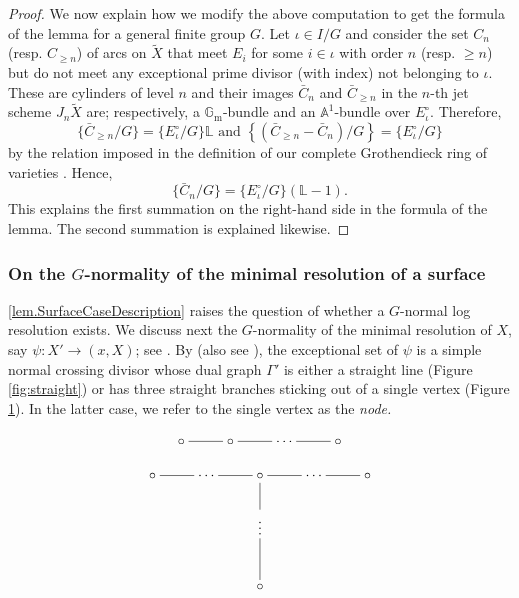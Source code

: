 \documentclass[12pt]{amsart}
\theoremstyle{plain}   %
\theoremstyle{definition}    %
\theoremstyle{remark}    %
\numberwithin{equation}{theorem}
\newcommand{\bA}{\mathbb{A}}
\newcommand{\bL}{\mathbb{L}}
\begin{document}
\begin{proof}
We now explain how we modify the above computation to get the formula of the lemma for a general finite group $G$. 
Let $\iota\in I/G$ and consider the set $C_{n}$ (resp. $C_{\ge n}$)
of arcs on $\tilde{X}$ that meet $E_{i}$ for some $i\in\iota$ with order $n$
(resp. $\ge n$) but do not meet any exceptional prime divisor (with index) not
belonging to $\iota$. These are cylinders of level $n$ and their
images $\bar{C}_n$ and $\bar{C}_{\ge n}$ in the $n$-th
jet scheme $J_{n}\tilde{X}$ are; respectively, a $\mathbb{G}_{\mathrm{m}}$-bundle and an $\bA^{1}$-bundle
over $E_{\iota}^{\circ}$. Therefore, 
\[
\{\bar{C}_{\ge n}/G\}=\{E_{\iota}^{\circ}/G\}\bL \text{ and } \left\{ \left(\bar{C}_{\ge n}-\bar{C}_n\right)/G\right\} =\{E_{\iota}^{\circ}/G\}
 \]
by the relation imposed in the definition of our complete Grothendieck
ring of varieties \cite[Definitions 9.5 and 9.6]{YasudaMotivicIntegrationDeligneMumfordStack}.
Hence, 
\[
\{\bar{C}_n/G\}=\{E_{\iota}^{\circ}/G\}(\bL-1).
\] 
This explains the first summation on the right-hand side in the formula of the lemma. The second summation is explained likewise.
\end{proof}

\subsubsection{On the $G$-normality of the minimal resolution of a surface}
\autoref{lem.SurfaceCaseDescription} raises the question of whether a $G$-normal log resolution exists. We discuss next the $G$-normality of the minimal resolution of $X$, say $\psi\colon X'\to (x,X)$; see \cite[Theorem 2.25]{KollarSingulaitieofMMP}. By
\cite[p. 123]{KollarSingulaitieofMMP} (also see \cite[\S3]{KollarFlipsAndAbundance}), the exceptional set of $\psi$ is a simple normal crossing divisor whose dual graph $\Gamma'$
is either a straight line (Figure \ref{fig:straight}) or has three
straight branches sticking out of a single vertex (Figure \ref{fig:three-branches}). In the latter case, we refer to the single vertex as the \emph{node.}
\begin{figure}[H]
\centering
\begin{minipage}{.5\textwidth}
  \centering
  \[
\xymatrix{\circ\ar@{-}[r] & \circ\ar@{-}[r] & \cdots & \circ\ar@{-}[l]}
\]
  \label{fig:straight}
\end{minipage}%
\begin{minipage}{.5\textwidth}
  \centering
  \[
\xymatrix{\circ\ar@{-}[r] & \cdots & \circ\ar@{-}[l]\ar@{-}[r]\ar@{-}[d] & \cdots & \circ\ar@{-}[l]\\
 &  & \vdots\\
 &  & \circ\ar@{-}[u]
}
\]
  \label{fig:three-branches}
\end{minipage}
\end{figure}
\end{document}
